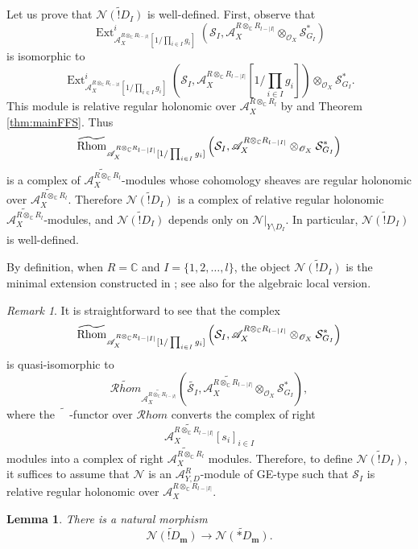 \documentclass{amsart}
\theoremstyle{plain}
\numberwithin{theorem}{section}
\newtheorem{lemma}[theorem]{Lemma}
\theoremstyle{definition}
\theoremstyle{remark}
\newtheorem{remark}[theorem]{Remark}
\theoremstyle{definition}
\newcommand{\wt}{\widetilde}
\newcommand{\C}{\mathbb{C}} %
\newcommand{\cN}{\mathcal{N}}
\newcommand{\cO}{\mathscr{O}}
\newcommand{\cS}{\mathcal{S}}
\newcommand{\bm}{\mathbf{m}}
\newcommand{\sA}{\mathscr{A}}
\newcommand{\Rhom}{\textup{Rhom}}
\newcommand{\cRhom}{\mathcal Rhom}
\begin{document}
Let us prove that $\wt{\cN(!D_I)}$ is well-defined. First, observe that
\[
\operatorname{Ext}^i_{\sA_X^{R\otimes_\C R_{l-|I|}}
[1/\prod_{i\in I}g_i]}
\left(
\cS_I,
\sA_X^{R\otimes_\C R_{l-|I|}}\otimes_{\cO_X}\cS_{G_I}^*
\right)
\]
is isomorphic to
\[
\operatorname{Ext}^i_{\sA_X^{R\otimes_\C R_{l-|I|}}
[1/\prod_{i\in I}g_i]}
\left(
\cS_I,
\sA_X^{R\otimes_\C R_{l-|I|}}
\left[1/\prod_{i\in I}g_i\right]
\right)
\otimes_{\cO_X}\cS_{G_I}^*.
\]
This module is relative regular holonomic over
$\sA_X^{R\otimes_\C R_l}$ by \cite[Cor. 3.9 and Prop. 4.34]{FFS23} and
Theorem \ref{thm:mainFFS}. Thus
\[
\widetilde{\Rhom}_{\sA_X^{R\otimes_\C R_{l-|I|}}
[1/\prod_{i\in I}g_i]}
\left(
\cS_I,
\sA_X^{R\otimes_\C R_{l-|I|}}\otimes_{\cO_X}\cS_{G_I}^*
\right)
\]
is a complex of $\widetilde{\sA_X^{R\otimes_\C R_l}}$-modules whose cohomology
sheaves are regular holonomic over
$\widetilde{\sA_X^{R\otimes_\C R_l}}$. Therefore
$\wt{\cN(!D_I)}$ is a complex of relative regular holonomic
$\widetilde{\sA_X^{R\otimes_\C R_l}}$-modules, and
$\wt{\cN(!D_I)}$ depends only on $\cN|_{Y\setminus D_I}$. In particular,
$\wt{\cN(!D_I)}$ is well-defined.

By definition, when $R=\C$ and $I=\{1,2,\dots,l\}$, the object
$\wt{\cN(!D_I)}$ is the minimal extension constructed in
\cite[\S 3.3]{WuRHA}; see also \cite[\S 5.1]{BVWZ2} for the algebraic local
version.

\begin{remark}\label{rmk:gnr!ex}
It is straightforward to see that the complex
\[
\widetilde{\Rhom}_{\sA_X^{R\otimes_\C R_{l-|I|}}
[1/\prod_{i\in I}g_i]}
\left(
\cS_I,
\sA_X^{R\otimes_\C R_{l-|I|}}\otimes_{\cO_X}\cS_{G_I}^*
\right)
\]
is quasi-isomorphic to
\[
\widetilde{\cRhom}_{\widetilde{\sA_X^{R\otimes_\C R_{l-|I|}}}}
\left(
\wt{\cS_I},
\widetilde{\sA_X^{R\otimes_\C R_{l-|I|}}}
\otimes_{\cO_X}\cS_{G_I}^*
\right),
\]
where the $\widetilde{\phantom{M}}$-functor over $\cRhom$ converts the complex
of right
\[
\widetilde{\sA_X^{R\otimes_\C R_{l-|I|}}}[s_i]_{i\in I}
\]
modules into a complex of right
$\widetilde{\sA_X^{R\otimes_\C R_l}}$
modules. Therefore, to define $\wt{\cN(!D_I)}$, it suffices to assume that
$\cN$ is an $\sA^R_{Y,D}$-module of GE-type such that $\cS_I$ is relative
regular holonomic over $\sA_X^{R\otimes_\C R_{l-|I|}}$.
\end{remark}

\begin{lemma}
There is a natural morphism
\[
\wt{\cN(!D_\bm)}\longrightarrow \wt{\cN(*D_\bm)}.
\]
\end{lemma}
\end{document}
